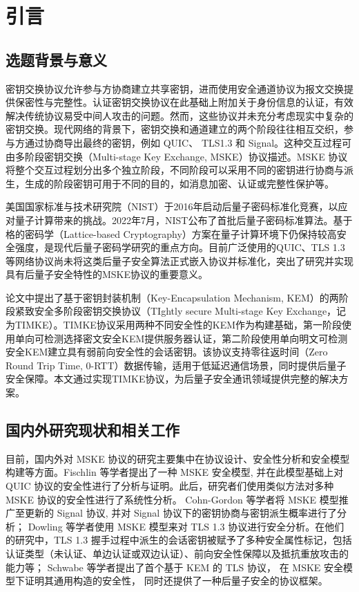 \section{引言}

\subsection{选题背景与意义}

密钥交换协议允许参与方协商建立共享密钥，进而使用安全通道协议为报文交换提供保密性与完整性。认证密钥交换协议在此基础上附加关于身份信息的认证，有效解决传统协议易受中间人攻击的问题。然而，这些协议并未充分考虑现实中复杂的密钥交换。现代网络的背景下，密钥交换和通道建立的两个阶段往往相互交织，参与方通过协商导出最终的密钥，例如 QUIC、 TLS1.3 和 Signal。这种交互过程可由多阶段密钥交换（Multi-stage Key Exchange, MSKE）协议描述。MSKE 协议将整个交互过程划分出多个独立阶段，不同阶段可以采用不同的密钥进行协商与派生，生成的阶段密钥可用于不同的目的，如消息加密、认证或完整性保护等。

美国国家标准与技术研究院（NIST）于2016年启动后量子密码标准化竞赛，以应对量子计算带来的挑战。2022年7月，NIST公布了首批后量子密码标准算法\cite{noauthor_nist_2022}。基于格的密码学（Lattice-based Cryptography）方案在量子计算环境下仍保持较高安全强度，是现代后量子密码学研究的重点方向。目前广泛使用的QUIC、TLS 1.3等网络协议尚未将这类后量子安全算法正式嵌入协议并标准化，突出了研究并实现具有后量子安全特性的MSKE协议的重要意义。

论文\cite{timke_2024}中提出了基于密钥封装机制（Key-Encapsulation Mechanism, KEM）的两阶段紧致安全多阶段密钥交换协议（TIghtly secure Multi-stage Key Exchange，记为TIMKE）。TIMKE协议采用两种不同安全性的KEM作为构建基础，第一阶段使用单向可检测选择密文安全KEM提供服务器认证，第二阶段使用单向明文可检测安全KEM建立具有弱前向安全性的会话密钥。该协议支持零往返时间（Zero Round Trip Time, 0-RTT）数据传输，适用于低延迟通信场景，同时提供后量子安全保障。本文通过实现TIMKE协议，为后量子安全通讯领域提供完整的解决方案。

\subsection{国内外研究现状和相关工作}

目前，国内外对 MSKE 协议的研究主要集中在协议设计、安全性分析和安全模型构建等方面。Fischlin 等学者\cite{fischlin_multi-stage_2014}提出了一种 MSKE 安全模型, 并在此模型基础上对 QUIC 协议的安全性进行了分析与证明。此后，研究者们使用类似方法对多种 MSKE 协议的安全性进行了系统性分析。 Cohn-Gordon 等学者\cite{cohn-gordon_formal_2016}将 MSKE 模型推广至更新的 Signal 协议, 并对 Signal 协议下的密钥协商与密钥派生概率进行了分析； Dowling 等学者\cite{dowling_cryptographic_2020}使用 MSKE 模型来对 TLS 1.3 协议进行安全分析。在他们的研究中，TLS 1.3 握手过程中派生的会话密钥被赋予了多种安全属性标记，包括认证类型（未认证、单边认证或双边认证）、前向安全性保障以及抵抗重放攻击的能力等； Schwabe 等学者\cite{schwabe_post-quantum_2020}提出了首个基于 KEM 的 TLS 协议， 在 MSKE 安全模型下证明其通用构造的安全性， 同时还提供了一种后量子安全的协议框架。

